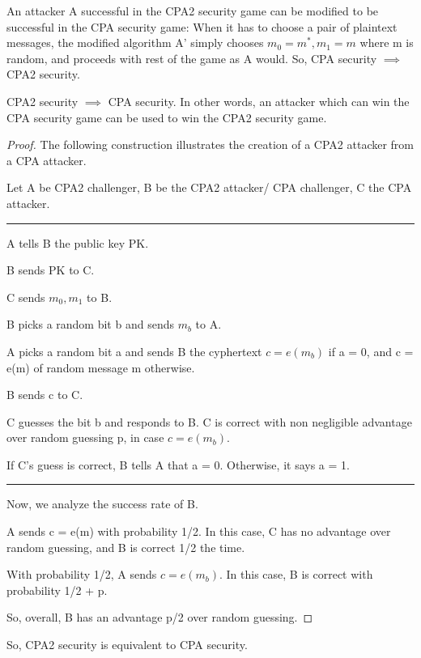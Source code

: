 \documentclass[10pt]{amsart}
\begin{document}
\begin{rem}
 An attacker A successful in the CPA2 security game can be modified to be successful in the CPA security game: When it has to choose a pair of plaintext messages, the modified algorithm A' simply chooses $m_{0} = m^{*}, m_{1} = m$ where m is random, and proceeds with rest of the game as A would. So, CPA security $\implies$ CPA2 security.
\end{rem}

\begin{thm}
 CPA2 security $\implies$ CPA security. In other words, an attacker which can win the CPA security game can be used to win the CPA2 security game.
\end{thm}
\begin{proof}
The following construction illustrates the creation of a CPA2 attacker from a CPA attacker.

Let A be CPA2 challenger, B be the CPA2 attacker/ CPA challenger, C the CPA attacker.

\hrule
A tells B the public key PK.

B sends PK to C.

C sends $m_{0}, m_{1}$ to B.

B picks a random bit b and sends $m_{b}$ to A.

A picks a random bit a and sends B the cyphertext $c = e(m_{b})$ if a = 0, and c = e(m) of random message m otherwise.

B sends c to C.

C guesses the bit b and responds to B. C is correct with non negligible advantage over random guessing p, in case $c = e(m_{b})$.

If C's guess is correct, B tells A that a = 0. Otherwise, it says a = 1.
\hrule

Now, we analyze the success rate of B.

A sends c = e(m) with probability 1/2. In this case, C has no advantage over random guessing, and B is correct 1/2 the time.

With probability 1/2, A sends $c = e(m_{b})$. In this case, B is correct with probability 1/2 + p.

So, overall, B has an advantage p/2 over random guessing.
\end{proof}

\begin{rem}
 So, CPA2 security is equivalent to CPA security.
\end{rem}
\end{document}
